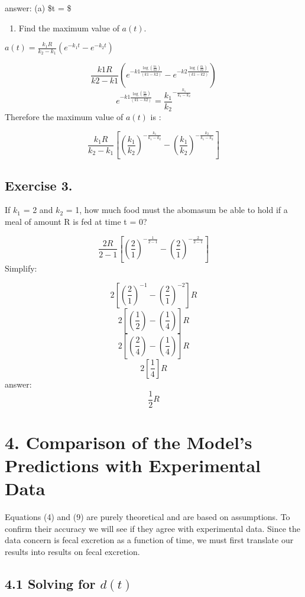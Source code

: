\documentclass[]{article}
\providecommand{\tightlist}{%
  \setlength{\itemsep}{0pt}\setlength{\parskip}{0pt}}
\begin{document}
answer: (a) \$t = \$

\newpage

\begin{enumerate}
\def\labelenumi{(\alph{enumi})}
\setcounter{enumi}{1}
\tightlist
\item
  Find the maximum value of \(a(t)\).
\end{enumerate}

\(a(t) = \frac{k_1R}{k_2-k_1}(e^{-k_1t}-e^{-k_2t})\)

\[\frac{k1 R}{k2 - k1}(e^{-k1 \frac{\log{(\frac{k1}{k2})}}{(k1 - k2)}}-e^{-k2 \frac{\log{(\frac{k1}{k2})}}{(k1 - k2)}})\]
\[e^{-k1 \frac{\log{(\frac{k1}{k2})}}{(k1 - k2)}}=\frac{k_1}{k_2}^{-\frac{k_1}{k_1 - k_2}}\]
Therefore the maximum value of \(a(t)\) is :

\[\frac{k_1R}{k_2-k_1}[(\frac{k_1}{k_2})^{-\frac{k_1}{k_1-k_2}}-(\frac{k_1}{k_2})^{-\frac{k_2}{k_1-k_2}}]\]

\subsection{Exercise 3.}\label{exercise-3.}

If \(k_1\) = 2 and \(k_2\) = 1, how much food must the abomasum be able
to hold if a meal of amount R is fed at time t = 0?

\[\frac{2 R}{2 - 1}[(\frac{2}{1})^{-\frac{1}{2-1}}-(\frac{2}{1})^{-\frac{2}{2-1}}]\]
Simplify:

\[2[(\frac{2}{1})^{-1}-(\frac{2}{1})^{-2}]R\]
\[2[(\frac{1}{2})-(\frac{1}{4})]R\] \[2[(\frac{2}{4})-(\frac{1}{4})]R\]
\[2[\frac{1}{4}]R\] answer: \[\frac{1}{2}R\]

\section{4. Comparison of the Model's Predictions with Experimental
Data}\label{comparison-of-the-models-predictions-with-experimental-data}

Equations (4) and (9) are purely theoretical and are based on
assumptions. To confirm their accuracy we will see if they agree with
experimental data. Since the data concern is fecal excretion as a
function of time, we must first translate our results into results on
fecal excretion.

\subsection{\texorpdfstring{4.1 Solving for
\(d(t)\)}{4.1 Solving for d(t)}}\label{solving-for-dt}
\end{document}
